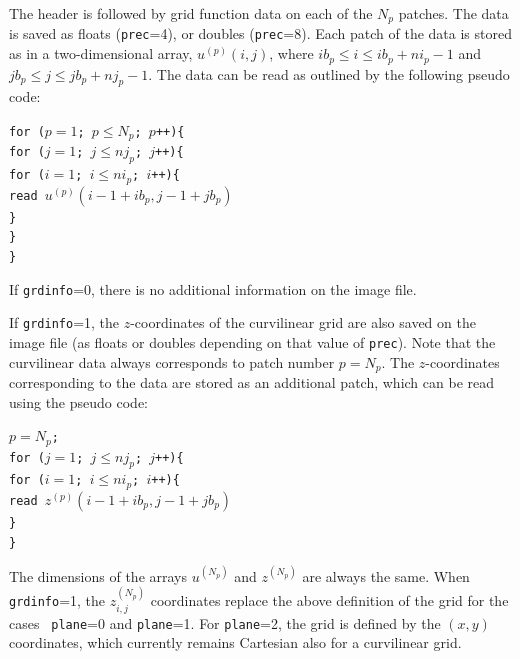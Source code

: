 \documentclass[11pt]{report}
\begin{document}
The header is followed by grid function data on each of the $N_p$ patches. The data is saved as
floats ({\tt prec}=4), or doubles ({\tt prec}=8). Each patch of the data is stored as in a
two-dimensional array, $u^{(p)}(i,j)$, where $ib_p\leq i \leq ib_p+ni_p-1$ and $jb_p\leq j \leq
jb_p+nj_p-1$. The data can be read as outlined by the following pseudo code:
\begin{flushleft}
{\tt for ($p=1$; $p\leq N_p$; $p$++)\{\\
\hspace{5mm}for ($j=1$; $j\leq nj_p$; $j$++)\{\\
\hspace{10mm}for ($i=1$; $i\leq ni_p$; $i$++)\{\\
\hspace{15mm}read $u^{(p)}(i-1+ib_p, j-1+jb_p)$\\
\hspace{10mm}\}\\
\hspace{5mm}\}\\
\}}
\end{flushleft}
If {\tt grdinfo}=0, there is no additional information on the image file.

If {\tt grdinfo}=1, the $z$-coordinates of the curvilinear grid are also saved on the image file
(as floats or doubles depending on that value of {\tt prec}). Note that the curvilinear data always
corresponds to patch number $p=N_p$. The $z$-coordinates corresponding to the data are stored as an
additional patch, which can be read using the pseudo code:
\begin{flushleft}
{\tt $p=N_p$;\\
for ($j=1$; $j\leq nj_p$; $j$++)\{\\
\hspace{5mm}for ($i=1$; $i\leq ni_p$; $i$++)\{\\
\hspace{10mm}read $z^{(p)}(i-1+ib_p, j-1+jb_p)$\\
\hspace{5mm}\}\\
\}}
\end{flushleft}
The dimensions of the arrays $u^{(N_p)}$ and $z^{(N_p)}$ are always the same.  When {\tt grdinfo}=1,
the $z^{(N_p)}_{i,j}$ coordinates replace the above definition of the grid for the cases {\tt
  plane}=0 and {\tt plane}=1. For {\tt plane}=2, the grid is defined by the $(x,y)$ coordinates,
which currently remains Cartesian also for a curvilinear grid.
\end{document}
